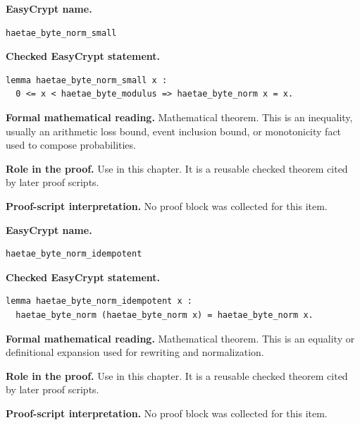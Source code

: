 \begin{formaltheorem}
\noindent\textbf{EasyCrypt name.}
\begin{lstlisting}[language=EasyCrypt,basicstyle=\ttfamily\scriptsize]
haetae_byte_norm_small
\end{lstlisting}
\noindent\textbf{Checked EasyCrypt statement.}
\begin{lstlisting}[language=EasyCrypt,basicstyle=\ttfamily\scriptsize]
lemma haetae_byte_norm_small x :
  0 <= x < haetae_byte_modulus => haetae_byte_norm x = x.
\end{lstlisting}
\noindent\textbf{Formal mathematical reading.}
Mathematical theorem. This is an inequality, usually an arithmetic loss bound, event inclusion bound, or monotonicity fact used to compose probabilities.

\noindent\textbf{Role in the proof.}
Use in this chapter. It is a reusable checked theorem cited by later proof scripts.

\noindent\textbf{Proof-script interpretation.}
No proof block was collected for this item.

\end{formaltheorem}

\begin{formaltheorem}
\noindent\textbf{EasyCrypt name.}
\begin{lstlisting}[language=EasyCrypt,basicstyle=\ttfamily\scriptsize]
haetae_byte_norm_idempotent
\end{lstlisting}
\noindent\textbf{Checked EasyCrypt statement.}
\begin{lstlisting}[language=EasyCrypt,basicstyle=\ttfamily\scriptsize]
lemma haetae_byte_norm_idempotent x :
  haetae_byte_norm (haetae_byte_norm x) = haetae_byte_norm x.
\end{lstlisting}
\noindent\textbf{Formal mathematical reading.}
Mathematical theorem. This is an equality or definitional expansion used for rewriting and normalization.

\noindent\textbf{Role in the proof.}
Use in this chapter. It is a reusable checked theorem cited by later proof scripts.

\noindent\textbf{Proof-script interpretation.}
No proof block was collected for this item.

\end{formaltheorem}

